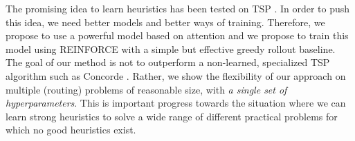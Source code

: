 The promising idea to learn heuristics has been tested on TSP \citep{bello2016neural}. In order to push this idea, we need better models and better ways of training. Therefore, we propose to use a powerful model based on attention and we propose to train this model using REINFORCE with a simple but effective greedy rollout baseline. The goal of our method is not to outperform a non-learned, specialized TSP algorithm such as Concorde \citep{concorde}. Rather, we show the flexibility of our approach on multiple (routing) problems of reasonable size, with \emph{a single set of hyperparameters}. This is important progress towards the situation where we can learn strong heuristics to solve a wide range of different practical problems for which no good heuristics exist. 